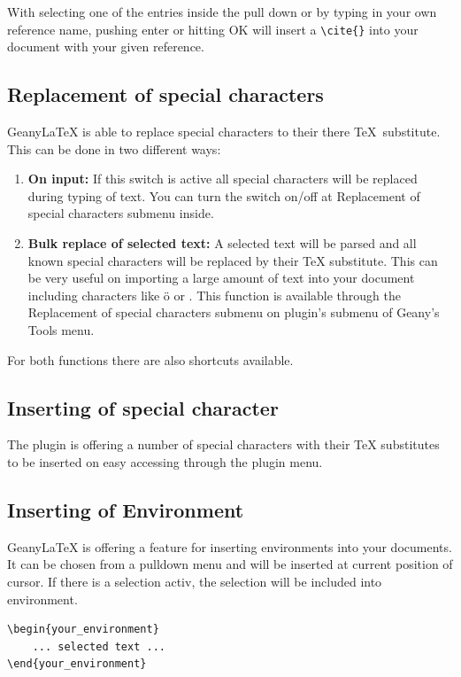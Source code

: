 \documentclass[%
paper=a4,%
fontsize=11pt,%
twoside=false,%
DIV18,%
headsepline,%
plainheadsepline,%
footsepline,%
plainfootsepline,%
bibliography=totoc,%
listof=totoc,%
BCOR10mm,%
parskip=half,%
openany,%
]{scrartcl}
\begin{document}
With selecting one of the entries inside the pull down or by typing
in your own reference name, pushing enter or hitting OK will insert
a \texttt{\textbackslash{}cite\{\}} into your document with your
given reference.

\subsection{Replacement of special characters}
Geany\LaTeX{} is able to replace special characters to their there \TeX\
substitute. This can be done in two different ways:

\begin{enumerate}
	\item \textbf{On input:} If this switch is active all special
		  characters will be replaced during typing of text. You can
		  turn the switch on/off at Replacement of special characters
		  submenu inside.
	\item \textbf{Bulk replace of selected text:}
		  A selected text will be parsed and all known special characters
		  will be replaced by their \TeX{} substitute. This can be very useful
		  on importing a large amount of text into your document
		  including characters like ö or \frqq. This function is
		  available through the Replacement of special characters
		  submenu on plugin's submenu of Geany's Tools menu.
\end{enumerate}

For both functions there are also shortcuts available.

\subsection{Inserting of special character}
The plugin is offering a number of special characters with their \TeX{}
substitutes to be inserted on easy accessing through the plugin menu.

\subsection{Inserting of Environment}
Geany\LaTeX{} is offering a feature for inserting environments into your
documents. It can be chosen from a pulldown menu and will be inserted at
current position of cursor. If there is a selection activ, the selection
will be included into environment.

\begin{lstlisting}
\begin{your_environment}
	... selected text ...
\end{your_environment}
\end{lstlisting}
\end{document}
